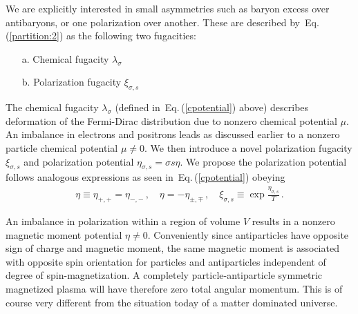 \documentclass[aps,prd,floatfix,reprint]{revtex4-2}
\newcommand{\req}[1]{Eq.\,(\ref{#1})}
\begin{document}
We are explicitly interested in small asymmetries such as baryon excess over antibaryons, or one polarization over another. These are described by~\req{partition:2} as the following two fugacities:
\begin{itemize}
 \item[a.] Chemical fugacity $\lambda_{\sigma}$
 \item[b.] Polarization fugacity $\xi_{\sigma,s}$
\end{itemize}
The chemical fugacity $\lambda_{\sigma}$ (defined in~\req{cpotential} above) describes deformation of the Fermi-Dirac distribution due to nonzero chemical potential $\mu$. An imbalance in electrons and positrons leads as discussed earlier to a nonzero particle chemical potential $\mu\neq0$. We then introduce a novel polarization fugacity $\xi_{\sigma,s}$ and polarization potential $\eta_{\sigma,s}=\sigma s\eta$. We propose the polarization potential follows analogous expressions as seen in~\req{cpotential} obeying
\begin{align}
 \label{spotential}
 \eta\equiv\eta_{+,+}=\eta_{-,-}\,,\quad\eta=-\eta_{\pm,\mp}\,,\quad\xi_{\sigma,s}\equiv\exp{\frac{\eta_{\sigma,s}}{T}}\,.
\end{align}

An imbalance in polarization within a region of volume $V$ results in a nonzero magnetic moment potential $\eta\neq0$. Conveniently since antiparticles have opposite sign of charge and magnetic moment, the same magnetic moment is associated with opposite spin orientation for particles and antiparticles independent of degree of spin-magnetization. A completely particle-antiparticle symmetric magnetized plasma will have therefore zero total angular momentum. This is of course very different from the situation today of a matter dominated universe.

\end{document}
